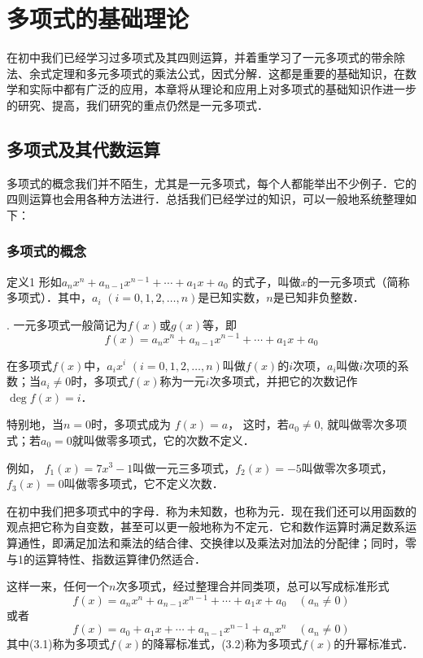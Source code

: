 \chapter{多项式的基础理论}
在初中我们已经学习过多项式及其四则运算，并着重学习了一元多项式的带余除法、余式定理和多元多项式的乘法公式，因式分解．这都是重要的基础知识，在数学和实际中都有广泛的应用，本章将从理论和应用上对多项式的基础知识作进一步的研究、提高，我们研究的重点仍然是一元多项式．

\section{多项式及其代数运算}
多项式的概念我们并不陌生，尤其是一元多项式，每个人都能举出不少例子．它的四则运算也会用各种方法进行．总括我们已经学过的知识，可以一般地系统整理如下：

\subsection{多项式的概念}
\begin{blk}{定义1}
    形如$a_nx^n+a_{n-1}x^{n-1}+\cdots+a_1x +a_0$
的式子，叫做$x$的一元多项式（简称多项式）．其中，$a_i$ $(i=0, 1, 2,\ldots,n)$是已知实数，$n$是已知非负整数．
\end{blk}
.
一元多项式一般简记为$f(x)$或$g(x)$等，即
$$f (x) =a_nx^n+a_{n-1}x^{n-1}+\cdots+a_1x +a_0$$

在多项式$f(x)$中，$a_ix^i$ $(i=0, 1, 2,\ldots,n)$叫做$f(x)$的$i$次项，$a_i$叫做$i$次项的系数；当$a_i\ne 0$时，多项式$f(x)$称为一元$i$次多项式，并把它的次数记作$\deg f(x)=i$．

特别地，当$n=0$时，多项式成为
$f (x) =a$，
这时，若$a_0\ne 0$, 就叫做零次多项式；若$a_0=0$就叫做零多项式，它的次数不定义．

例如，
$f_1(x)=7x^3-1$叫做一元三多项式，$f_2(x)=-5$叫做零次多项式，$f_3(x)=0$叫做零多项式，它不定义次数．

\begin{rmk}
    在初中我们把多项式中的字母．称为未知数，也称为元．现在我们还可以用函数的观点把它称为自变数，甚至可以更一般地称为不定元．它和数作运算时满足数系运算通性，即满足加法和乘法的结合律、交换律以及乘法对加法的分配律；同时，零与1的运算特性、指数运算律仍然适合．
\end{rmk}

这样一来，任何一个$n$次多项式，经过整理合并同类项，总可以写成标准形式
\begin{equation}
f(x)=a_nx^n+a_{n-1}x^{n-1}+\cdots+a_1x +a_0\quad (a_n\ne 0)
\end{equation}
或者
\begin{equation}
    f(x)=a_0+a_1x+\cdots+a_{n-1}x^{n-1}+a_nx^n\quad (a_n\ne 0)
\end{equation}
其中(3.1)称为多项式$f(x)$的降幂标准式，(3.2)称为多项式$f(x)$的升幂标准式．

